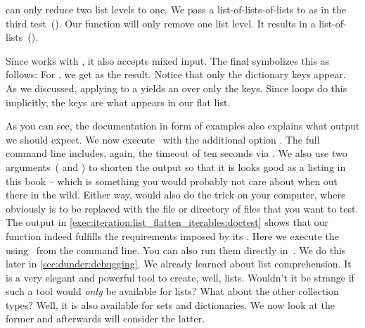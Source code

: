 can only reduce two list levels to one.
We pass a list-of-lists-of-lists to  as in the third test~().
Our function will only remove one list level.
It results in a list-of-lists~(\pythonil{[[1], [2], [3], [4], [5], [6]]}).%
%
\begin{sloppypar}%
Since  works with , it also accepts mixed input.
The final  symbolizes this as follows:
For , we get \pythonil{[1, 2, 3, 4, 5, 6, 'a', 'b']} as the result.
Notice that only the dictionary keys appear.
As we discussed, applying  to a  yields an  over only the keys.
Since  loops do this implicitly, the keys are what appears in our flat list.%
\end{sloppypar}%
%
As you can see, the documentation in form of examples also explains what output we should expect.
We now execute \pytest\ with the additional option .
The full command line includes, again, the timeout of ten seconds via .
We also use two arguments~( and ) to shorten the output so that it is looks good as a listing in this book -- which is something you would probably not care about when out there in the wild.
Either way,  would also do the trick on your computer, where  obviously is to be replaced with the file or directory of files that you want to test.
The output in \cref{exec:iteration:list_flatten_iterables:doctest} shows that our function indeed fulfills the requirements imposed by its .%
%
%
%
Here we execute the  using \pytest\ from the command line.
You can also run them directly in~\pycharm.
We do this later in \cref{sec:dunder:debugging}.%
%
\FloatBarrier%
\endhsection%
%
%
%
We already learned about list comprehension.
It is a very elegant and powerful tool to create, well, lists.
Wouldn't it be strange if such a tool would \emph{only} be available for lists?
What about the other collection types?
Well, it is also available for sets and dictionaries.
We now look at the former and afterwards will consider the latter.


